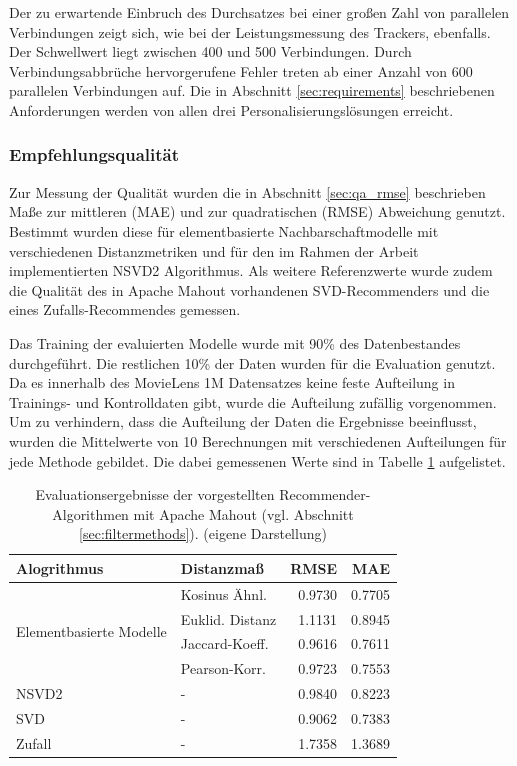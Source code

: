 Der zu erwartende Einbruch des Durchsatzes bei einer großen Zahl von parallelen Verbindungen zeigt sich, wie bei der Leistungsmessung des Trackers, ebenfalls. Der Schwellwert liegt zwischen 400 und 500  Verbindungen. Durch Verbindungsabbrüche hervorgerufene Fehler treten ab einer Anzahl von 600 parallelen Verbindungen auf. Die in Abschnitt \ref{sec:requirements} beschriebenen Anforderungen werden von allen drei Personalisierungslösungen erreicht.

\subsubsection{Empfehlungsqualität}

Zur Messung der Qualität wurden die in Abschnitt \ref{sec:qa_rmse} beschrieben Maße zur mittleren (\acs{MAE}) und zur quadratischen (\acs{RMSE}) Abweichung genutzt. Bestimmt wurden diese für elementbasierte Nachbarschaftmodelle mit verschiedenen Distanzmetriken und für den im Rahmen der Arbeit implementierten NSVD2 Algorithmus. Als weitere Referenzwerte wurde zudem die Qualität des in Apache Mahout vorhandenen SVD-Recommenders und die eines Zufalls-Recommendes gemessen.

Das Training der evaluierten Modelle wurde mit 90\% des Datenbestandes durchgeführt. Die restlichen 10\% der Daten wurden für die Evaluation genutzt. Da es innerhalb des MovieLens 1M Datensatzes keine feste Aufteilung in Trainings- und Kontrolldaten gibt, wurde die Aufteilung zufällig vorgenommen. Um zu verhindern, dass die Aufteilung der Daten die Ergebnisse beeinflusst, wurden die Mittelwerte von 10 Berechnungen mit verschiedenen Aufteilungen für jede Methode gebildet. Die dabei gemessenen Werte sind in Tabelle \ref{tab:rmse-eval} aufgelistet.

\vfill
\begin{table}[h]
  \centering
  \begin{minipage}[b]{5in}
  \begin{tabular}{ | l | l || r | r | }
  \hline
  \textbf { Alogrithmus } &   \textbf { Distanzmaß } &   \textbf { RMSE } &   \textbf { MAE } \\ \hline
  \multirow{4}{*}{Elementbasierte Modelle}  & Kosinus Ähnl. & 0.9730 & 0.7705 \\ 
 & Euklid. Distanz & 1.1131 & 0.8945\\   
 & Jaccard-Koeff. & 0.9616 & 0.7611 \\
 & Pearson-Korr.  & 0.9723 & 0.7553 \\ \hline
  NSVD2 & - & 	0.9840  & 0.8223 \\
  SVD &  - &	0.9062 & 0.7383 \\ \hline
  Zufall & -	&	1.7358 & 1.3689 \\ \hline
  \end{tabular}
  \caption{\footnotesize Evaluationsergebnisse der vorgestellten Recommender-Algorithmen mit Apache Mahout  (vgl. Abschnitt \ref{sec:filtermethods}). { \scriptsize (eigene Darstellung)}}
  \label{tab:rmse-eval}
\end{minipage}
\end{table}

